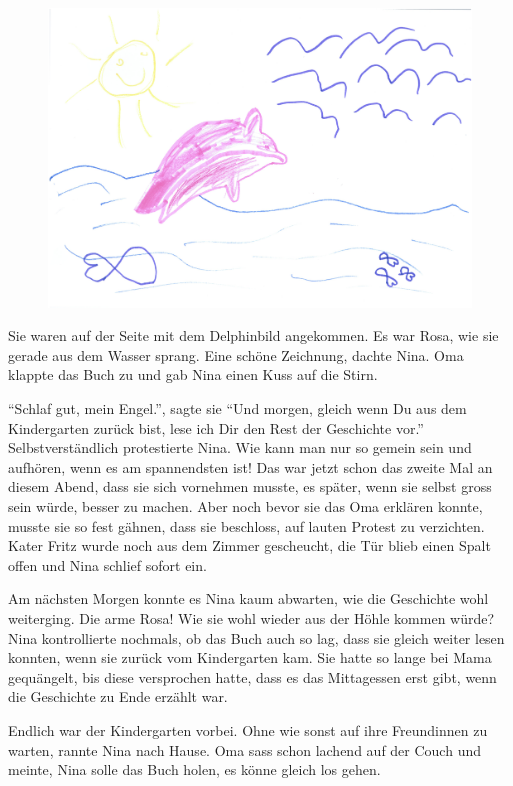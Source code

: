 \begin{figure}[h]
\centering
\includegraphics[width=.7\textwidth]{bilder/oma1.pdf}
\end{figure}

\vspace{10pt}
 \centerline{\Huge \Dolphin[red]}
\vspace{10pt}

Sie waren auf der Seite mit dem Delphinbild angekommen. Es war Rosa, wie sie gerade aus dem Wasser sprang. Eine schöne Zeichnung, dachte Nina. Oma klappte das Buch zu und gab Nina einen Kuss auf die Stirn.

\enquote{Schlaf gut, mein Engel.}, sagte sie \enquote{Und morgen, gleich wenn Du aus dem Kindergarten zurück bist, lese ich Dir den Rest der Geschichte vor.} Selbstverständlich protestierte Nina. Wie kann man nur so gemein sein und aufhören, wenn es am spannendsten ist! Das war jetzt schon das zweite Mal an diesem Abend, dass sie sich vornehmen musste, es später, wenn sie selbst gross sein würde, besser zu machen. Aber noch bevor sie das Oma erklären konnte, musste sie so fest gähnen, dass sie beschloss, auf lauten Protest zu verzichten. Kater Fritz wurde noch aus dem Zimmer gescheucht, die Tür blieb einen Spalt offen und Nina schlief sofort ein.

Am nächsten Morgen konnte es Nina kaum abwarten, wie die Geschichte wohl weiterging. Die arme Rosa! Wie sie wohl wieder aus der Höhle kommen würde? Nina kontrollierte nochmals, ob das Buch auch so lag, dass sie gleich weiter lesen konnten, wenn sie zurück vom Kindergarten kam. Sie hatte so lange bei Mama gequängelt, bis diese versprochen hatte, dass es das Mittagessen erst gibt, wenn die Geschichte zu Ende erzählt war.

Endlich war der Kindergarten vorbei. Ohne wie sonst auf ihre Freundinnen zu warten, rannte Nina nach Hause. Oma sass schon lachend auf der Couch und meinte, Nina solle das Buch holen, es könne gleich los gehen.

